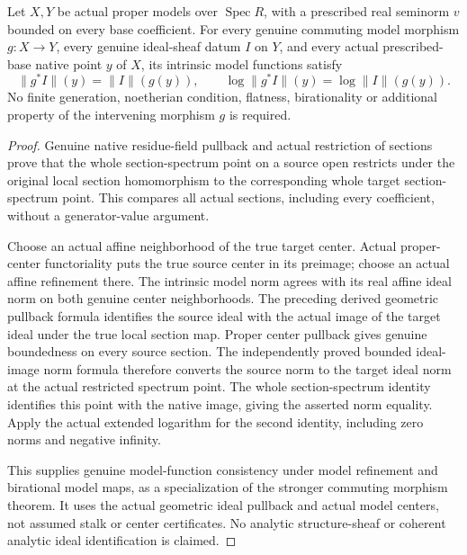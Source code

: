\begin{theorem}
\label{scheme:proper-model-ideal-pullback}
\leanok
{}
Let $X,Y$ be actual proper models over $\operatorname{Spec}R$, with a
prescribed real seminorm $v$ bounded on every base coefficient. For every
genuine commuting model morphism $g:X\to Y$, every genuine ideal-sheaf
datum $I$ on $Y$, and every actual prescribed-base native point $y$ of
$X$, its intrinsic model functions satisfy
\[
 \|g^*I\|(y)=\|I\|(g(y)),\qquad
 \log\|g^*I\|(y)=\log\|I\|(g(y)).
\]
No finite generation, noetherian condition, flatness, birationality or
additional property of the intervening morphism $g$ is required.
\end{theorem}
\begin{proof}
Genuine native residue-field pullback and actual restriction of sections
prove that the whole section-spectrum point on a source open restricts
under the original local section homomorphism to the corresponding
whole target section-spectrum point. This compares all actual sections,
including every coefficient, without a generator-value argument.

Choose an actual affine neighborhood of the true target center. Actual
proper-center functoriality puts the true source center in its preimage;
choose an actual affine refinement there. The intrinsic model norm agrees
with its real affine ideal norm on both genuine center neighborhoods.
The preceding derived geometric pullback formula identifies the source
ideal with the actual image of the target ideal under the true local
section map. Proper center pullback gives genuine boundedness on every
source section. The independently proved bounded ideal-image norm
formula therefore converts the source norm to the target ideal norm at
the actual restricted spectrum point. The whole section-spectrum identity
identifies this point with the native image, giving the asserted norm
equality. Apply the actual extended logarithm for the second identity,
including zero norms and negative infinity.

This supplies genuine model-function consistency under model refinement
and birational model maps, as a specialization of the stronger commuting
morphism theorem. It uses the actual geometric ideal pullback and actual
model centers, not assumed stalk or center certificates. No analytic
structure-sheaf or coherent analytic ideal identification is claimed.
\end{proof}
